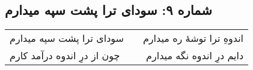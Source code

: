 \begin{center}
\section*{شماره ۹: سودای ترا پشت سپه میدارم}
\label{sec:009}
\begin{longtable}{l p{0.5cm} r}
سودای ترا پشت سپه میدارم
&&
اندوهِ ترا توشهٔ ره میدارم
\\
چون از درِ اندوه درآمد کارم
&&
دایم درِ اندوه نگه میدارم
\\
\end{longtable}
\end{center}
